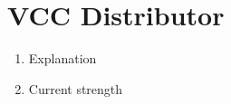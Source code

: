 \section{VCC Distributor}

\begin{enumerate}
  \item Explanation
  \item Current strength
\end{enumerate}
